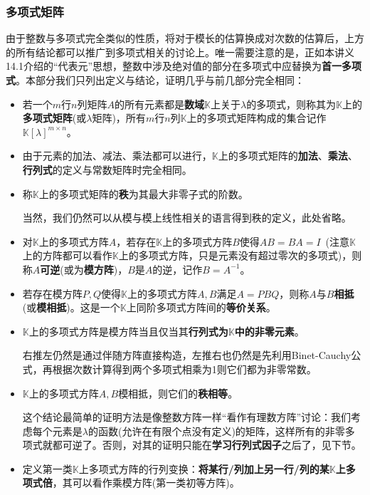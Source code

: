 \documentclass[a4paper,UTF8,fontset=windows,AutoFakeBold]{ctexart}
\newcommand*{\note}{\noindent *}
\begin{document}
\subsubsection{多项式矩阵}
由于整数与多项式完全类似的性质，将对于模长的估算换成对次数的估算后，上方的所有结论都可以推广到多项式相关的讨论上。唯一需要注意的是，正如本讲义14.1介绍的``代表元''思想，整数中涉及绝对值的部分在多项式中应替换为\textbf{首一多项式}。本部分我们只列出定义与结论，证明几乎与前几部分完全相同：
\begin{itemize}
    \item 若一个$m$行$n$列矩阵$A$的所有元素都是\textbf{数域}$\mathbb{K}$上关于$\lambda$的多项式，则称其为$\mathbb{K}$上的\textbf{多项式矩阵}(或$\lambda$矩阵)，所有$m$行$n$列$\mathbb{K}$上的多项式矩阵构成的集合记作$\mathbb{K}[\lambda]^{m\times n}$。
    \item 由于元素的加法、减法、乘法都可以进行，$\mathbb{K}$上的多项式矩阵的\textbf{加法}、\textbf{乘法}、\textbf{行列式}的定义与常数矩阵时完全相同。
    \item 称$\mathbb{K}$上的多项式矩阵的\textbf{秩}为其最大非零子式的阶数。
    
    \note 当然，我们仍然可以从模与模上线性相关的语言得到秩的定义，此处省略。
    \item 对$\mathbb{K}$上的多项式方阵$A$，若存在$\mathbb{K}$上的多项式方阵$B$使得$AB=BA=I$\ (注意$\mathbb{K}$上的方阵都可以看作$\mathbb{K}$上的多项式方阵，只是元素没有超过零次的多项式)，则称$A$\textbf{可逆}(或为\textbf{模方阵})，$B$是$A$的逆，记作$B=A^{-1}$。
    \item 若存在模方阵$P,Q$使得$\mathbb{K}$上的多项式方阵$A,B$满足$A=PBQ$，则称$A$与$B$\textbf{相抵}(或\textbf{模相抵})。这是一个$\mathbb{K}$上同阶多项式方阵间的\textbf{等价关系}。
    \item $\mathbb{K}$上的多项式方阵是模方阵当且仅当其\textbf{行列式为$\mathbb{K}$中的非零元素}。
    
    \note 右推左仍然是通过伴随方阵直接构造，左推右也仍然是先利用Binet-Cauchy公式，再根据次数计算得到两个多项式相乘为1则它们都为非零常数。

    \item $\mathbb{K}$上的多项式方阵$A,B$模相抵，则它们的\textbf{秩相等}。
    
    \note 这个结论最简单的证明方法是像整数方阵一样``看作有理数方阵''讨论：我们考虑每个元素是$\lambda$的函数(允许在有限个点没有定义)的矩阵，这样所有的非零多项式就都可逆了。否则，对其的证明只能在\textbf{学习行列式因子}之后了，见下节。

    \item 定义第一类$\mathbb{K}$上多项式方阵的行列变换：\textbf{将某行/列加上另一行/列的某$\mathbb{K}$上多项式倍}，其可以看作乘模方阵(第一类初等方阵)。
    

\end{itemize}
\end{document}
